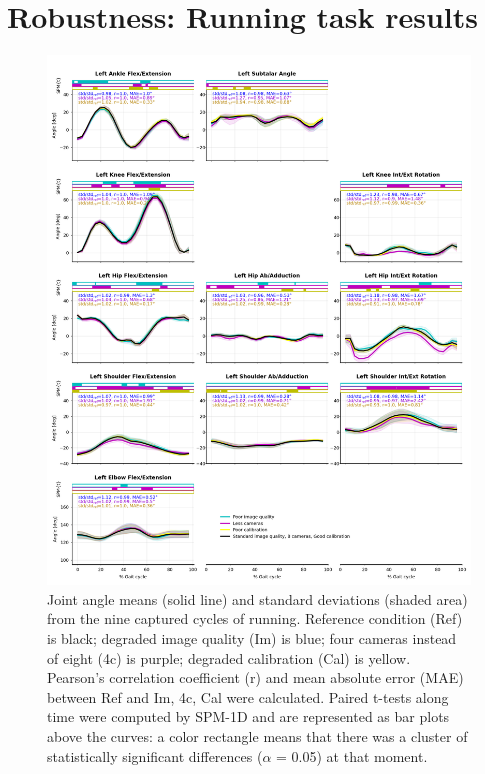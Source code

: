 \minitoc
\newpage

\section{Robustness: Running task results}

\begin{figure}[!ht]
	\centering
	\def\svgwidth{1\columnwidth}
	\fontsize{10pt}{10pt}\selectfont
	\includegraphics[height=\dimexpr\textheight-145pt]{"../Annexes/Figures/Fig_RunRobust.png"}
	\caption{Joint angle means (solid line) and standard deviations (shaded area) from the nine captured cycles of running. Reference condition (Ref) is black; degraded image quality (Im) is blue; four cameras instead of eight (4c) is purple; degraded calibration (Cal) is yellow. Pearson’s correlation coefficient (r) and mean absolute error (MAE) between Ref and Im, 4c, Cal were calculated. Paired t-tests along time were computed by SPM-1D and are represented as bar plots above the curves: a color rectangle means that there was a cluster of statistically significant differences (\(\alpha\) = 0.05) at that moment.}
	\label{fig_runrobust}
\end{figure}

